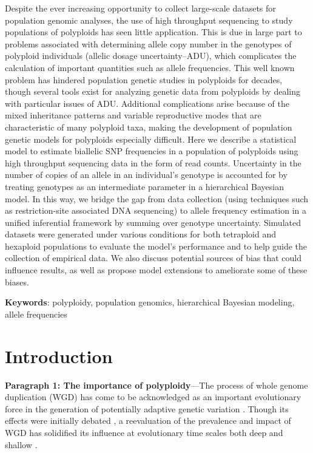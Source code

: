 \documentclass[11pt,english,letterpaper,oneside]{article}
\begin{document}
Despite the ever increasing opportunity to collect large-scale datasets for population genomic analyses, the use of high throughput sequencing to study populations of polyploids has seen little application. This is due in large part to problems associated with determining allele copy number in the genotypes of polyploid individuals (allelic dosage uncertainty--ADU), which complicates the calculation of important quantities such as allele frequencies. This well known problem has hindered population genetic studies in polyploids for decades, though several tools exist for analyzing genetic data from polyploids by dealing with particular issues of ADU. Additional complications arise because of the mixed inheritance patterns and variable reproductive modes that are characteristic of many polyploid taxa, making the development of population genetic models for polyploids especially difficult. Here we describe a statistical model to estimate biallelic SNP frequencies in a population of polyploids using high throughput sequencing data in the form of read counts. Uncertainty in the number of copies of an allele in an individual's genotype is accounted for by treating genotypes as an intermediate parameter in a hierarchical Bayesian model. In this way, we bridge the gap from data collection (using techniques such as restriction-site associated DNA sequencing) to allele frequency estimation in a unified inferential framework by summing over genotype uncertainty. Simulated datasets were generated under various conditions for both tetraploid and hexaploid populations to evaluate the model's performance and to help guide the collection of empirical data. We also discuss potential sources of bias that could influence results, as well as propose model extensions to ameliorate some of these biases.
\vspace{0.25in}

\noindent \textbf{Keywords}: polyploidy, population genomics, hierarchical Bayesian modeling, allele frequencies
\vspace{0.25in}

\section*{Introduction}            %

\textbf{Paragraph 1: The importance of polyploidy}---The process of whole genome duplication (WGD) has come to be acknowledged as an important evolutionary force in the generation of potentially adaptive genetic variation \citep{otto2000polyploidy,soltis2000PNASployploidy,soltisD2003polyploid,soltisd2009diversification,soltisd2010polyploidUnknowns,soltisd2014stebbins,Selmecki2015yeastAdaptation}. Though its effects were initially debated \citep{wagner1970noise,StebbinsVariationEvolution}, a reevaluation of the prevalence and impact of WGD has solidified its influence at evolutionary time scales both deep and shallow \citep{soltisd2004tragopogon,comai2005polyploid,cui2006genomeDuplication,jiao2011ancientWGD,canon2014polyploidyLegumes,douglas2015diploidizationCapsella}. 
\end{document}
